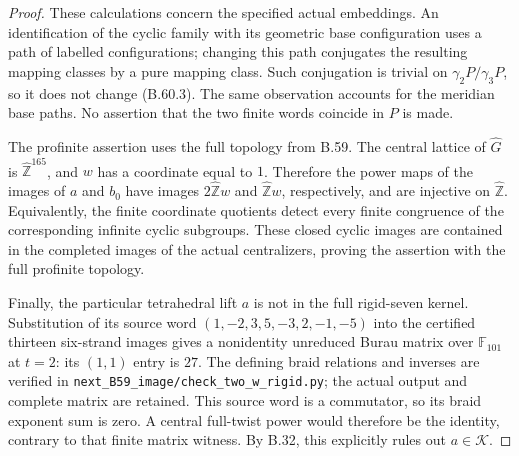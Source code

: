 \begin{proof}
These calculations concern the specified actual embeddings.
An identification of the cyclic family with its geometric
base configuration uses a path of labelled configurations;
changing this path conjugates the resulting mapping classes
by a pure mapping class.  Such conjugation is trivial on
$\gamma_2P/\gamma_3P$, so it does not change (B.60.3).
The same observation accounts for the meridian base paths.
No assertion that the two finite words coincide in $P$
is made.

The profinite assertion uses the full topology from B.59.
The central lattice of $\widehat G$ is
$\widehat{\mathbb Z}^{165}$, and $w$ has a coordinate equal
to $1$.  Therefore the power maps of the images of $a$ and
$b_0$ have images $2\widehat{\mathbb Z}w$ and
$\widehat{\mathbb Z}w$, respectively, and are injective
on $\widehat{\mathbb Z}$.  Equivalently, the finite coordinate
quotients detect every finite congruence of the corresponding
infinite cyclic subgroups.  These closed cyclic images
are contained in the completed images of the actual
centralizers, proving the assertion with the full profinite
topology.

Finally, the particular tetrahedral lift $a$ is not in the
full rigid-seven kernel.  Substitution of its source word
$(1,-2,3,5,-3,2,-1,-5)$ into the certified thirteen
six-strand images gives a nonidentity unreduced Burau
matrix over $\mathbb F_{101}$ at $t=2$: its $(1,1)$ entry
is $27$.  The defining braid relations and inverses are
verified in
\nolinkurl{next_B59_image/check_two_w_rigid.py}; the actual
output and complete matrix are retained.
This source word is a commutator, so its braid exponent
sum is zero.  A central full-twist power would therefore
be the identity, contrary to that finite matrix witness.
By B.32, this explicitly rules out $a\in\mathcal K$.
\end{proof}
